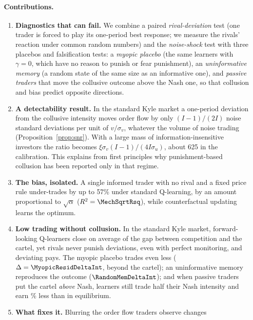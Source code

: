 \paragraph{Contributions.}
\begin{enumerate}
\item \textbf{Diagnostics that can fail.} We combine a paired
  \emph{rival-deviation} test (one trader is forced to play its one-period
  best response; we measure the rivals' reaction under common random numbers)
  and the \citet{dou2025} \emph{noise-shock} test with three placebos and
  falsification tests: a \emph{myopic placebo} (the same learners with
  $\gamma=0$, which have no reason to punish or fear punishment), an
  \emph{uninformative memory} (a random state of the same size as an
  informative one), and \emph{passive traders} that move the collusive outcome
  above the Nash one, so that collusion and bias predict opposite directions.
\item \textbf{A detectability result.} In the standard Kyle market a
  one-period deviation from the collusive intensity moves order flow by only
  $(I-1)/(2I)$ noise standard deviations per unit of $v/\sigma_v$, whatever the
  volume of noise trading (Proposition~\ref{prop:snr}). With a large mass of
  information-insensitive investors the ratio becomes
  $\xi\sigma_v(I-1)/(4I\sigma_u)$, about 625 in the \citet{dou2025}
  calibration. This explains from first principles why punishment-based
  collusion has been reported only in that regime.
\item \textbf{The bias, isolated.} A single informed trader with no rival and
  a fixed price rule under-trades by up to 57\% under standard Q-learning, by
  an amount proportional to $\sqrt\alpha$ ($R^2=\MechSqrtRsq$), while
  counterfactual updating learns the optimum.
\item \textbf{Low trading without collusion.} In the standard Kyle market,
  forward-looking Q-learners close on average \ResidDeltaInt{} of the gap
  between competition and the cartel, yet rivals never punish deviations,
  even with perfect monitoring, and deviating pays. The myopic placebo trades
  even less ($\Delta=\MyopicResidDeltaInt$, beyond the cartel); an uninformative
  memory reproduces the outcome ($\RandomMemDeltaInt$); and when passive
  traders put the cartel \emph{above} Nash, learners still trade half their
  Nash intensity and earn \PassiveProfitPct\% less than in equilibrium.
\item \textbf{What fixes it.} Blurring the order flow traders observe changes

\end{enumerate}
